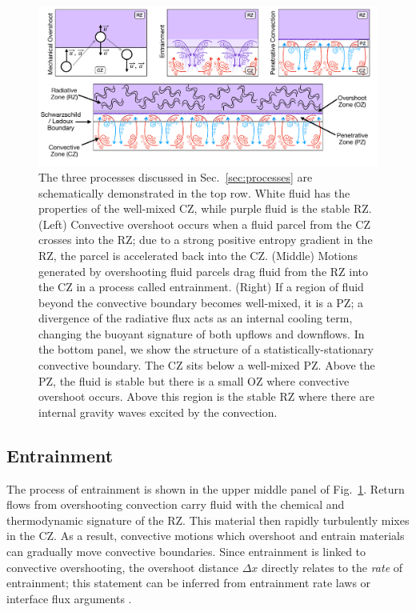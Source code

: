 \begin{figure}[t]
\centering
\includegraphics[width=\textwidth]{processes_and_structure_figure.pdf}
\caption{
    The three processes discussed in Sec.~\ref{sec:processes} are schematically demonstrated in the top row.
    White fluid has the properties of the well-mixed CZ, while purple fluid is the stable RZ.
    (Left) Convective overshoot occurs when a fluid parcel from the CZ crosses into the RZ; due to a strong positive entropy gradient in the RZ, the parcel is accelerated back into the CZ.
    (Middle) Motions generated by overshooting fluid parcels drag fluid from the RZ into the CZ in a process called entrainment.
    (Right) If a region of fluid beyond the convective boundary becomes well-mixed, it is a PZ; a divergence of the radiative flux acts as an internal cooling term, changing the buoyant signature of both upflows and downflows.
    In the bottom panel, we show the structure of a statistically-stationary convective boundary.
    The CZ sits below a well-mixed PZ.
    Above the PZ, the fluid is stable but there is a small OZ where convective overshoot occurs.
    Above this region is the stable RZ where there are internal gravity waves excited by the convection.
\label{fig:schema}
}
\end{figure}





\subsection{Entrainment}
The process of entrainment is shown in the upper middle panel of Fig.~\ref{fig:schema}.
Return flows from overshooting convection carry fluid with the chemical and thermodynamic signature of the RZ.
This material then rapidly turbulently mixes in the CZ.
As a result, convective motions which overshoot and entrain materials can gradually move convective boundaries.
Since entrainment is linked to convective overshooting, the overshoot distance $\Delta x$ directly relates to the \emph{rate} of entrainment; this statement can be inferred from entrainment rate laws \citep{meakin_arnett_2007} or interface flux arguments \citep{fuentes_cumming_2020}.

